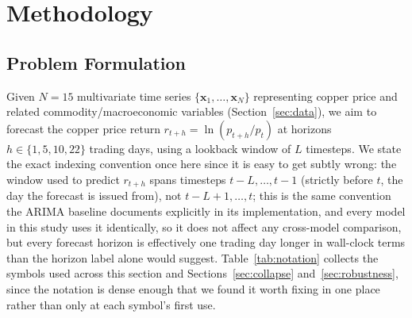 \documentclass[journal]{IEEEtran}
\begin{document}
\section{Methodology}
\label{sec:method}

\subsection{Problem Formulation}

Given $N=15$ multivariate time series $\{\mathbf{x}_1, \ldots, \mathbf{x}_N\}$ representing copper price and related commodity/macroeconomic variables (Section~\ref{sec:data}), we aim to forecast the copper price return $r_{t+h} = \ln(p_{t+h}/p_t)$ at horizons $h \in \{1, 5, 10, 22\}$ trading days, using a lookback window of $L$ timesteps. We state the exact indexing convention once here since it is easy to get subtly wrong: the window used to predict $r_{t+h}$ spans timesteps $t-L,\ldots,t-1$ (strictly before $t$, the day the forecast is issued from), not $t-L+1,\ldots,t$; this is the same convention the ARIMA baseline documents explicitly in its implementation, and every model in this study uses it identically, so it does not affect any cross-model comparison, but every forecast horizon is effectively one trading day longer in wall-clock terms than the horizon label alone would suggest. Table~\ref{tab:notation} collects the symbols used across this section and Sections~\ref{sec:collapse} and~\ref{sec:robustness}, since the notation is dense enough that we found it worth fixing in one place rather than only at each symbol's first use.
\end{document}
